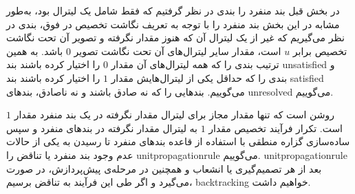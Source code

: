 در بخش قبل بند منفرد را بندی در نظر گرفتیم که فقط شامل یک لیترال بود، به‌طور مشابه در این بخش  بند منفرد را  با توجه به تعریف نگاشت تخصیص در فوق، بندی در نظر می‌گیریم که غیر از یک لیترال آن که هنوز مقدار نگرفته و تصویر آن تحت نگاشت  تخصیص برابر 
$u$
است، مقدار سایر لیترال‌های آن تحت نگاشت تصویر 
$0$
باشد.  به همین ترتیب بندی را که همه لیترال‌های آن مقدار 
$0$
را اختیار کرده باشند بند 
\gls*{unsatisfied}
و بندی را که حداقل یکی از لیترال‌هایش مقدار 
$1$
را اختیار کرده باشند بند 
\gls*{satisfied}
می‌گوییم. بندهایی را که نه صادق  باشند و نه ناصادق، بندهای 
\gls*{unresolved}
می‌گوییم.  

روشن است که  تنها مقدار مجاز برای لیترال مقدار نگرفته در یک بند منفرد مقدار 
$1$
است.   تکرار  فرآیند تخصیص مقدار 
$1$
به لیترال مقدار نگرفته در بندهای منفرد  و سپس ساده‌سازی گزاره منطقی با استفاده از قاعده بند‌های منفرد تا رسیدن به یکی از حالات عدم وجود بند منفرد یا تناقض را 
\gls*{unitpropagationrule}
می‌گوییم.  
\gls*{unitpropagationrule}
بعد از هر تصمیم‌گیری یا انشعاب و همچنین در مرحله‌ی پیش‌پردازش، در  
 صورت می‌گیرد و اگر طی این فرآیند به  تناقض برسیم، 
\gls*{backtracking}
خواهیم داشت. 
 

